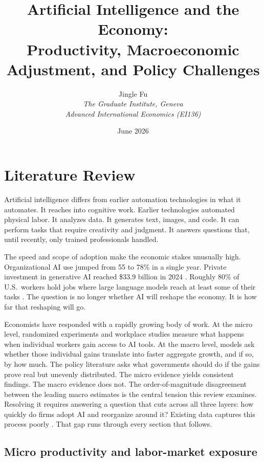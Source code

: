 \documentclass[12pt]{article}
\title{Artificial Intelligence and the Economy:\\
Productivity, Macroeconomic Adjustment, and Policy Challenges}
\author{Jingle Fu\\
\textit{The Graduate Institute, Geneva}\\
\textit{Advanced International Economics (EI136)}}
\date{June 2026}
\begin{document}
\maketitle

\section{Literature Review}

Artificial intelligence differs from earlier automation technologies in what it automates. It reaches into cognitive work. Earlier technologies automated physical labor. It analyzes data. It generates text, images, and code. It can perform tasks that require creativity and judgment. It answers questions that, until recently, only trained professionals handled.

The speed and scope of adoption make the economic stakes unusually high. Organizational AI use jumped from 55 to 78\% in a single year. Private investment in generative AI reached \$33.9 billion in 2024 \citep{stanfordhai2025}. Roughly 80\% of U.S.\ workers hold jobs where large language models reach at least some of their tasks \citep{eloundou2024}. The question is no longer whether AI will reshape the economy. It is how far that reshaping will go.

Economists have responded with a rapidly growing body of work. At the micro level, randomized experiments and workplace studies measure what happens when individual workers gain access to AI tools. At the macro level, models ask whether those individual gains translate into faster aggregate growth, and if so, by how much. The policy literature asks what governments should do if the gains prove real but unevenly distributed. The micro evidence yields consistent findings. The macro evidence does not. The order-of-magnitude disagreement between the leading macro estimates is the central tension this review examines. Resolving it requires answering a question that cuts across all three layers: how quickly do firms adopt AI and reorganize around it? Existing data captures this process poorly \citep{brynjolfsson2025agenda}. That gap runs through every section that follows.


\subsection{Micro productivity and labor-market exposure}
\end{document}
